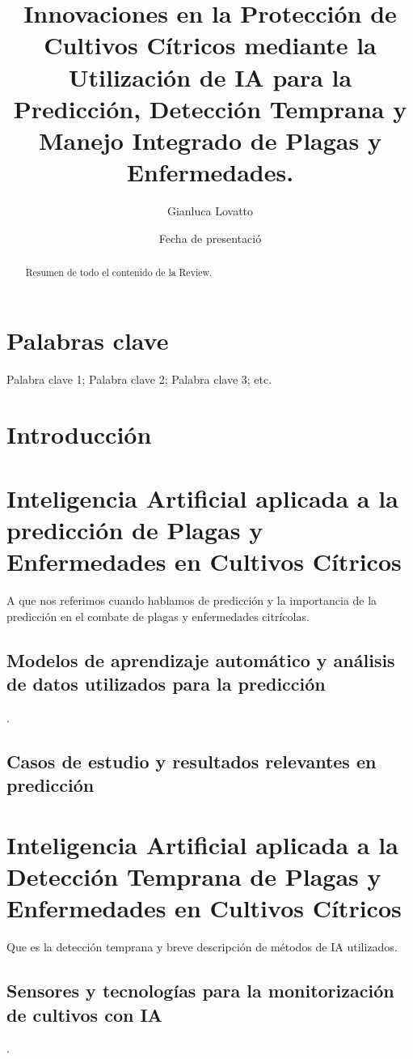 \documentclass[12pt]{article}
\title{Innovaciones en la Protección de Cultivos Cítricos mediante la Utilización de IA para la Predicción, Detección Temprana y Manejo Integrado de Plagas y Enfermedades.}
\author{Gianluca Lovatto}
\date{Fecha de presentació}
\begin{document}
\maketitle

\begin{abstract}
Resumen de todo el contenido de la Review.

\end{abstract}

\section*{Palabras clave}
Palabra clave 1; Palabra clave 2; Palabra clave 3; etc.

\section{Introducción}


\section{Inteligencia Artificial aplicada a la predicción de Plagas y Enfermedades en Cultivos Cítricos}
A que nos referimos cuando hablamos de predicción y la importancia de la predicción en el combate de plagas y enfermedades citrícolas. 



\subsection{Modelos de aprendizaje automático y análisis de datos utilizados para la predicción}
 \citep{autor_año}.

\subsection{Casos de estudio y resultados relevantes en predicción}


\section{Inteligencia Artificial aplicada a la Detección Temprana de Plagas y Enfermedades en Cultivos Cítricos}
Que es la detección temprana y breve descripción de métodos de IA utilizados.

\subsection{Sensores y tecnologías para la monitorización de cultivos con IA}
 \citep{autor_año}.
\end{document}

